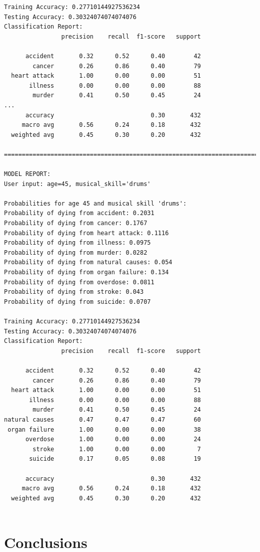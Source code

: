 \documentclass{article}
\begin{document}
\begin{verbatim}
Training Accuracy: 0.27710144927536234
Testing Accuracy: 0.30324074074074076
Classification Report:
                precision    recall  f1-score   support

      accident       0.32      0.52      0.40        42
        cancer       0.26      0.86      0.40        79
  heart attack       1.00      0.00      0.00        51
       illness       0.00      0.00      0.00        88
        murder       0.41      0.50      0.45        24
...
      accuracy                           0.30       432
     macro avg       0.56      0.24      0.18       432
  weighted avg       0.45      0.30      0.20       432

==============================================================================

MODEL REPORT:
User input: age=45, musical_skill='drums'

Probabilities for age 45 and musical skill 'drums':
Probability of dying from accident: 0.2031
Probability of dying from cancer: 0.1767
Probability of dying from heart attack: 0.1116
Probability of dying from illness: 0.0975
Probability of dying from murder: 0.0282
Probability of dying from natural causes: 0.054
Probability of dying from organ failure: 0.134
Probability of dying from overdose: 0.0811
Probability of dying from stroke: 0.043
Probability of dying from suicide: 0.0707

Training Accuracy: 0.27710144927536234
Testing Accuracy: 0.30324074074074076
Classification Report:
                precision    recall  f1-score   support

      accident       0.32      0.52      0.40        42
        cancer       0.26      0.86      0.40        79
  heart attack       1.00      0.00      0.00        51
       illness       0.00      0.00      0.00        88
        murder       0.41      0.50      0.45        24
natural causes       0.47      0.47      0.47        60
 organ failure       1.00      0.00      0.00        38
      overdose       1.00      0.00      0.00        24
        stroke       1.00      0.00      0.00         7
       suicide       0.17      0.05      0.08        19

      accuracy                           0.30       432
     macro avg       0.56      0.24      0.18       432
  weighted avg       0.45      0.30      0.20       432


\end{verbatim}



\section{Conclusions}
\end{document}
